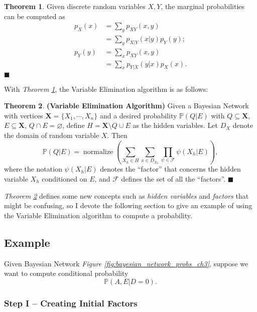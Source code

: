 \documentclass{article}
\theoremstyle{definition}
\newtheorem{theorem}{Theorem}
\newenvironment{theoremqed}
    {\begin{theorem}}
    {\hfill \qedsymbol \end{theorem}}
\renewcommand{\qedsymbol}{\(\blacksquare\)}
\newcommand{\X}{\mathbf{X}}
\renewcommand{\P}{\mathbb{P}}
\begin{document}
\begin{theoremqed} \label{thm:marginal}
    Given discrete random variables \(X, Y\), the marginal probabilities can be computed as
    \begin{align*}
        p_X(x) &= \sum_y p_{XY}(x, y) \\
        &= \sum_y p_{X|Y}(x|y) p_Y(y); \\
        p_Y(y) &= \sum_x p_{XY}(x, y) \\
        &= \sum_x p_{Y|X}(y|x) p_X(x).
    \end{align*}
\end{theoremqed}

With \textit{Theorem \ref{thm:marginal}}, the Variable Elimination algorithm is as follows:

\begin{theoremqed} \label{thm:vea}
    \textbf{(Variable Elimination Algorithm)} Given a Bayesian Network with vertices \(\X = \{X_1, \cdots, X_n\}\) and a desired probability \(\P(Q | E)\) with \(Q \subseteq \X\), \(E \subseteq \X\), \(Q \cap E = \varnothing\), define \(H = \X \setminus Q \cup E\) as the hidden variables. Let \(D_X\) denote the domain of random variable \(X\). Then
    \[\P(Q | E) = \operatorname{normalize}\left(\sum_{X_h \in H} \sum_{x\in D_{X_h}} \prod_{\psi \in \mathcal{F}} \psi(X_h|E) \right),\]
    where the notation \(\psi(X_h|E)\) denotes the ``factor'' that concerns the hidden variable \(X_h\) conditioned on \(E\), and \(\mathcal{F}\) defines the set of all the ``factors''.
\end{theoremqed}

\textit{Theorem \ref{thm:vea}} defines some new concepts such as \textit{hidden variables} and \textit{factors} that might be confusing, so I devote the following section to give an example of using the Variable Elimination algorithm to compute a probability.

\subsection{Example}

Given Bayesian Network \textit{Figure \ref{fig:bayesian_network_probs_ch3}}, suppose we want to compute conditional probability
\[\P(A, E | D = 0).\]

\subsubsection{Step I -- Creating Initial Factors}
\end{document}
